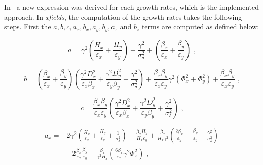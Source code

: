 In~\cite{CERN:Antoniou:Revision_IBS_MADX} a new expression was derived for each growth rates, which is the implemented approach.
In \textit{xfields}, the computation of the growth rates takes the following steps.
First the \(a, b, c, a_x, b_x, a_y, b_y, a_z\) and \(b_z\) terms are computed as defined below:

\begin{equation}
    a = \gamma^2 \left(\frac{H_x}{\varepsilon_x} + \frac{H_y}{\varepsilon_y}\right) + \frac{\gamma^2}{\sigma_{\delta}^{2}} + \left(\frac{\beta_x}{\varepsilon_x} + \frac{\beta_y}{\varepsilon_y} \right) \text{ ,}
    \label{equation:bm_a}
\end{equation}

\begin{equation}
    b = \left(\frac{\beta_x}{\varepsilon_x} + \frac{\beta_y}{\varepsilon_y}\right) \left(\frac{\gamma^2 D_x^{2}}{\varepsilon_x \beta_x} + \frac{\gamma^2 D_y^{2}}{\varepsilon_y \beta_y} + \frac{\gamma^2}{\sigma_{\delta}^{2}}\right) + \frac{\beta_x \beta_y}{\varepsilon_x \varepsilon_y} \gamma^2 \left( \Phi_x^{2} + \Phi_y^{2}\right) + \frac{\beta_x \beta_y}{\varepsilon_x \varepsilon_y} \text{ ,}
    \label{equation:bm_b}
\end{equation}

\begin{equation}
    c = \frac{\beta_x \beta_y}{\varepsilon_x \varepsilon_y} \left( \frac{\gamma^2 D_x^{2}}{\varepsilon_x \beta_x} + \frac{\gamma^2 D_y^{2}}{\varepsilon_y \beta_y} + \frac{\gamma^2}{\sigma_{\delta}^{2}} \right) \text{ ,}
    \label{equation:bm_c}
\end{equation}

\begin{equation}
    \begin{aligned}
    a_x = & 2 \gamma^2 \left(\frac{H_x}{\varepsilon_x} + \frac{H_y}{\varepsilon_y} + \frac{1}{\sigma_{\delta}^{2}}\right) - \frac{\beta_x H_y}{H_x \varepsilon_y} + \frac{\beta_x}{H_x \gamma^2} \left( \frac{2 \beta_x}{\varepsilon_y} - \frac{\beta_y}{\varepsilon_y} - \frac{\gamma^2}{\sigma_{\delta}^{2}} \right) \\
          & - 2 \frac{\beta_x}{\varepsilon_x} \frac{\beta_y}{\varepsilon_y} + \frac{\beta_x}{\gamma^2 H_x} \left( \frac{6 \beta_x}{\varepsilon_x} \gamma^2 \Phi_x^{2} \right) \text{ ,}
    \end{aligned}
    \label{equation:bm_ax}
\end{equation}

